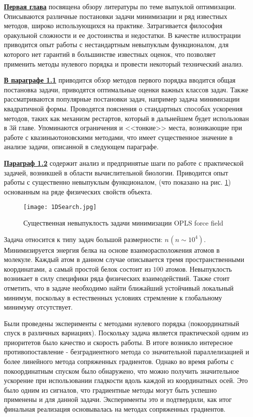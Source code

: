 \underline{\textbf{Первая глава}} посвящена обзору литературы по теме выпуклой оптимизации. Описываются различные постановки задачи минимизации и ряд известных методов, широко использующихся на практике. Затрагивается философия оракульной сложности и ее достоинства и недостатки. В качестве иллюстрации приводится опыт работы с нестандартным невыпуклым функционалом, для которого нет гарантий в большинстве известных оценок, что позволяет применить методы нулевого порядка и провести некоторый технический анализ.

\underline{\textbf{В параграфе 1.1}} приводится обзор методов первого порядка вводится общая постановка задачи, приводятся оптимальные оценки важных классов задач. Также рассматриваются популярные постановки задач, например задача минимизации квадратичной формы. Проводятся пояснения о стандартных способах ускорения методов, таких как механизм рестартов, который в дальнейшем будет использован в 3й главе. Упоминаются ограничения и <<тонкие>> места, возникающие при работе с квазиньютоновскими методами, что имеет существенное значение в анализе задачи, описанной в следующем параграфе. 

\underline{\textbf{Параграф 1.2}} содержит анализ и предпринятые шаги по работе с практической задачей, возникшей в области вычислительной биологии. Приводится опыт работы с существенно невыпуклым функционалом, (что показано на рис. \ref{fig1D}) основанным на ряде физических свойств объекта. 

\begin{figure}
\begin{center}
    \texttt{[image: 1DSearch.jpg]}
\end{center}
\caption{Существенная невыпуклость задачи минимизации OPLS force field}
\label{fig1D}
\end{figure}
     
Задача относится к типу задач большой размерности:  $n_{ }\left(n\sim 10^4\right)$. Минимизируется энергия белка на основе взаиморасположения атомов в молекуле. Каждый атом в данном случае описывается тремя пространственными координатами, а самый простой белок состоит из $100$ атомов. Невыпуклость возникает в силу специфики ряда физических взаимодействий. Также стоит отметить, что в задаче необходимо найти ближайший устойчивый локальный минимум, поскольку в естественных условиях стремление к глобальному минимуму отсутствует. 

Были проведены эксперименты с методами нулевого порядка (покоординатный спуск в различных вариациях). Поскольку задача является практической одним из приоритетов было качество и скорость работы. В итоге возникло интересное противопоставление - безградиентного метода со значительной параллелизацией и более линейного метода сопряженных градиентов. Однако во время работы с покоординатным спуском было обнаружено, что можно получить значительное ускорение при использовании гладкости вдоль каждой из координатных осей. Это было одним из сигналов, что градиентные методы могут быть успешно применены и для данной задачи. Эксперименты это и подтвердили, как итог финальная реализация основывалась на методах сопряженных градиентов.

